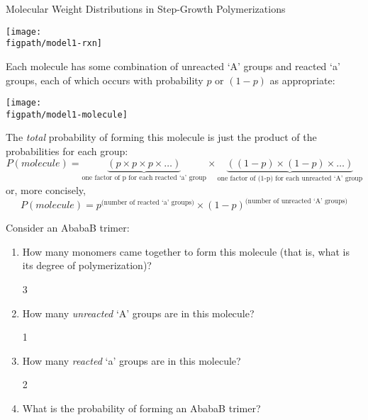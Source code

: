 \begin{activity}{Molecular Weight Distributions in Step-Growth Polymerizations}
\begin{model}
	\centerline{\texttt{[image: \\figpath/model1-rxn]}}

	Each molecule has some combination of unreacted `A' groups and reacted `a' groups, each of which occurs with probability $p$ or $(1-p)$ as appropriate:

	\centerline{\texttt{[image: \\figpath/model1-molecule]}}
	
	The \emph{total} probability of forming this molecule is just the product of the probabilities for each group:
	\begin{equation*}
		P(molecule) = \underbrace{(p \times p \times p \times \dots)}_{\text{one factor of p for each reacted `a' group}} \times \underbrace{((1-p) \times (1-p) \times \dots)}_{\text{one factor of (1-p) for each unreacted `A' group}} 
	\end{equation*}
or, more concisely,
	\begin{equation*}
		P(molecule) = p^\text{(number of reacted `a' groups)}\times(1-p)^\text{(number of unreacted `A' groups)}
	\end{equation*}


\end{model}

\vspace{0.05in}
\begin{ctqs}
	
	\question Consider an AbabaB trimer:
		\begin{enumerate}
			\item How many monomers came together to form this molecule (that is, what is its degree of polymerization)?
			
				\begin{solution}[0.5in]
					3
				\end{solution}
				
			\item How many \emph{unreacted} `A' groups are in this molecule?
			
				\begin{solution}[0.5in]
					1
				\end{solution}
				
			\item How many \emph{reacted} `a' groups are in this molecule?
			
				\begin{solution}[0.5in]
					2
				\end{solution}
				
			\item What is the probability of forming an AbabaB trimer?
			

\end{enumerate}
\end{ctqs}
\end{activity}
